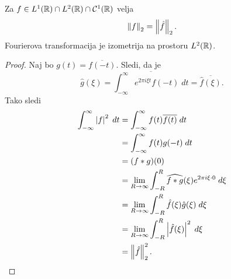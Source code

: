 
\begin{izrek}[Plancherel]
Za $f \in L^1(\mathbb{R}) \cap L^2(\mathbb{R}) \cap \mathcal{C}^1(\mathbb{R})$ velja
\[
\left\lVert f\right\rVert_2 = \left\lVert \hat{f}\right\rVert_2.
\]
Fourierova transformacija je izometrija na prostoru $L^2(\mathbb{R})$.
\end{izrek}

\begin{proof}
Naj bo $g(t)=\overline{f(-t)}$. Sledi, da je
\[
\hat{g}(\xi) =
\overline{\int_{-\infty}^\infty e^{2 \pi i \xi t} f(-t)\;dt} =
\overline{\hat{f}(\xi)}.
\]
Tako sledi
\begin{align*}
\int_{-\infty}^\infty \left\lvert f\right\rvert^2\;dt
&=
\int_{-\infty}^\infty f(t) \overline{f(t)}\;dt
\\
&=
\int_{-\infty}^\infty f(t) g(-t)\;dt
\\
&=
(f*g)(0)
\\
&=
\lim_{R \to \infty} \int_{-R}^R
\widehat{f*g}(\xi) e^{2 \pi i \xi \cdot 0}\;d\xi
\\
&=
\lim_{R \to \infty} \int_{-R}^R \hat{f}(\xi) \hat{g}(\xi)\;d\xi
\\
&=
\lim_{R \to \infty} \int_{-R}^R \left\lvert \hat{f}(\xi)\right\rvert^2\;d\xi
\\
&=
\left\lVert \hat{f}\right\rVert_2^2. \qedhere
\end{align*}
\end{proof}
